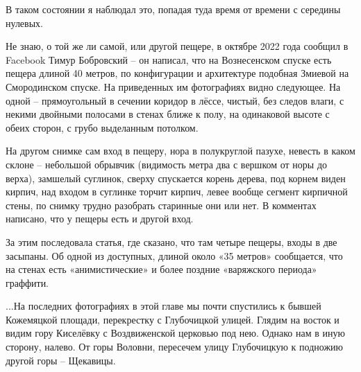 В таком состоянии я наблюдал это, попадая туда время от времени с середины нулевых.

Не знаю, о той же ли самой, или другой пещере, в октябре 2022 года сообщил в Facebook Тимур Бобровский – он написал, что на Вознесенском спуске есть пещера длиной 40 метров, по конфигурации и архитектуре подобная Змиевой на Смородинском спуске. На приведенных им фотографиях видно следующее. На одной – прямоугольный в сечении коридор в лёссе, чистый, без следов влаги, с некими двойными полосами в стенах ближе к полу, на одинаковой высоте с обеих сторон, с грубо выделанным потолком. 

На другом снимке сам вход в пещеру, нора в полукруглой пазухе, невесть в каком склоне – небольшой обрывчик (видимость метра два с вершком от норы до верха), замшелый суглинок, сверху спускается корень дерева, под корнем виден кирпич, над входом в суглинке торчит кирпич, левее вообще сегмент кирпичной стены, по снимку трудно разобрать старинные они или нет. В комментах написано, что у пещеры есть и другой вход.

За этим последовала статья, где сказано, что там четыре пещеры, входы в две засыпаны. Об одной из доступных, длиной около «35 метров» сообщается, что на стенах есть «анимистические» и более поздние «варяжского периода» граффити.
   
...На последних фотографиях в этой главе мы почти спустились к бывшей Кожемяцкой площади, перекрестку с Глубочицкой улицей. Глядим на восток и видим гору Киселёвку с Воздвиженской церковью под нею. Однако нам в иную сторону, налево. От горы Воловни, пересечем улицу Глубочицкую к подножию другой горы – Щекавицы.